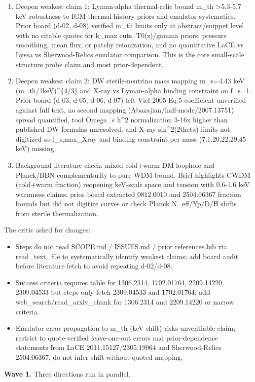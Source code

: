 \documentclass[11pt,a4paper]{article}
\begin{document}
\begin{enumerate}
  \item Deepen weakest claim 1: Lyman-alpha thermal-relic bound m\_th \textgreater{}5.3-5.7 keV robustness to IGM thermal history priors and emulator systematics. Prior board (d-02, d-08) verified m\_th limits only at abstract/snippet level with no citable quotes for k\_max cuts, T0(z)/gamma priors, pressure smoothing, mean flux, or patchy reionization, and no quantitative LaCE vs Lyssa vs Sherwood-Relics emulator comparison. This is the core small-scale structure probe claim and most prior-dependent.
  \item Deepen weakest claim 2: DW sterile-neutrino mass mapping m\_s=4.43 keV (m\_th/1keV)\textasciicircum{}\{4/3\} and X-ray vs Lyman-alpha binding constraint on f\_s=1. Prior board (d-03, d-05, d-06, d-07) left Viel 2005 Eq.5 coefficient unverified against full text, no second mapping (Abazajian/half-mode/2007.13751) spread quantified, tool Omega\_s h\textasciicircum{}2 normalization 3-16x higher than published DW formulas unresolved, and X-ray sin\textasciicircum{}2(2theta) limits not digitized so f\_s,max\_Xray and binding constraint per mass (7.1,20,22,29,45 keV) missing.
  \item Background literature check: mixed cold+warm DM loophole and Planck/BBN complementarity to pure WDM bound. Brief highlights CWDM (cold+warm fraction) reopening keV-scale space and tension with 0.6-1.6 keV warmness claims; prior board extracted 0812.0010 and 2504.06367 fraction bounds but did not digitize curves or check Planck N\_eff/Yp/D/H shifts from sterile thermalization.
\end{enumerate}
The critic asked for changes:

\begin{itemize}
  \item Steps do not read SCOPE.md / ISSUES.md / prior references.bib via read\_text\_file to systematically identify weakest claims; add board audit before literature fetch to avoid repeating d-02/d-08.
  \item Success criteria requires table for 1306.2314, 1702.01764, 2209.14220, 2309.04533 but steps only fetch 2309.04533 and 1702.01764; add web\_search/read\_arxiv\_chunk for 1306.2314 and 2209.14220 or narrow criteria.
  \item Emulator error propagation to m\_th (keV shift) risks unverifiable claim; restrict to quote-verified leave-one-out errors and prior-dependence statements from LaCE 2011.15127/2305.19064 and Sherwood-Relics 2504.06367, do not infer shift without quoted mapping.
\end{itemize}
\textbf{Wave 1.} Three directions run in parallel.
\end{document}
